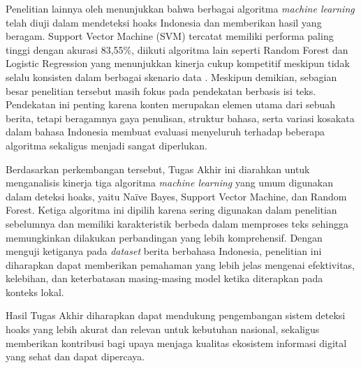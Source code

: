 Penelitian lainnya oleh \textcite{triyono2023indonesian} menunjukkan bahwa berbagai algoritma \textit{machine learning} telah diuji dalam mendeteksi hoaks Indonesia dan memberikan hasil yang beragam. Support Vector Machine (SVM) tercatat memiliki performa paling tinggi dengan akurasi 83,55\%, diikuti algoritma lain seperti Random Forest dan Logistic Regression yang menunjukkan kinerja cukup kompetitif meskipun tidak selalu konsisten dalam berbagai skenario data \autocite{triyono2023indonesian}. Meskipun demikian, sebagian besar penelitian tersebut masih fokus pada pendekatan berbasis isi teks. Pendekatan ini penting karena konten merupakan elemen utama dari sebuah berita, tetapi beragamnya gaya penulisan, struktur bahasa, serta variasi kosakata dalam bahasa Indonesia membuat evaluasi menyeluruh terhadap beberapa algoritma sekaligus menjadi sangat diperlukan.

Berdasarkan perkembangan tersebut, Tugas Akhir ini diarahkan untuk menganalisis kinerja tiga algoritma \textit{machine learning} yang umum digunakan dalam deteksi hoaks, yaitu Na\"{i}ve Bayes, Support Vector Machine, dan Random Forest. Ketiga algoritma ini dipilih karena sering digunakan dalam penelitian sebelumnya dan memiliki karakteristik berbeda dalam memproses teks sehingga memungkinkan dilakukan perbandingan yang lebih komprehensif. Dengan menguji ketiganya pada \textit{dataset} berita berbahasa Indonesia, penelitian ini diharapkan dapat memberikan pemahaman yang lebih jelas mengenai efektivitas, kelebihan, dan keterbatasan masing-masing model ketika diterapkan pada konteks lokal.

Hasil Tugas Akhir diharapkan dapat mendukung pengembangan sistem deteksi hoaks yang lebih akurat dan relevan untuk kebutuhan nasional, sekaligus memberikan kontribusi bagi upaya menjaga kualitas ekosistem informasi digital yang sehat dan dapat dipercaya.


